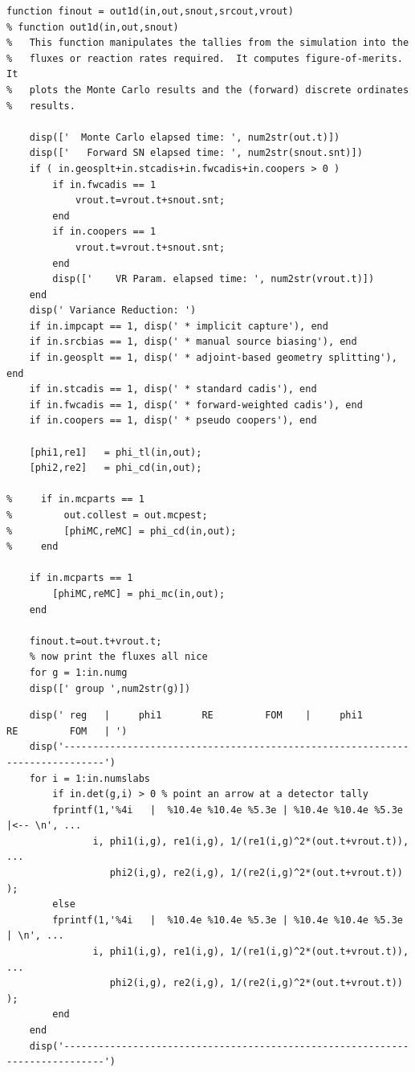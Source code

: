 \documentclass[letter,11pt]{article}
\begin{document}
{\small
\begin{verbatim}
function finout = out1d(in,out,snout,srcout,vrout)
% function out1d(in,out,snout)
%   This function manipulates the tallies from the simulation into the
%   fluxes or reaction rates required.  It computes figure-of-merits.  It
%   plots the Monte Carlo results and the (forward) discrete ordinates
%   results.

	disp(['  Monte Carlo elapsed time: ', num2str(out.t)])
    disp(['   Forward SN elapsed time: ', num2str(snout.snt)])
    if ( in.geosplt+in.stcadis+in.fwcadis+in.coopers > 0 )
        if in.fwcadis == 1
            vrout.t=vrout.t+snout.snt;
        end
        if in.coopers == 1
            vrout.t=vrout.t+snout.snt;
        end
        disp(['    VR Param. elapsed time: ', num2str(vrout.t)])
    end
    disp(' Variance Reduction: ')
    if in.impcapt == 1, disp(' * implicit capture'), end
    if in.srcbias == 1, disp(' * manual source biasing'), end
    if in.geosplt == 1, disp(' * adjoint-based geometry splitting'), end
    if in.stcadis == 1, disp(' * standard cadis'), end
    if in.fwcadis == 1, disp(' * forward-weighted cadis'), end
    if in.coopers == 1, disp(' * pseudo coopers'), end
    
    [phi1,re1]   = phi_tl(in,out);
    [phi2,re2]   = phi_cd(in,out);

%     if in.mcparts == 1
%         out.collest = out.mcpest;
%         [phiMC,reMC] = phi_cd(in,out);
%     end
    
    if in.mcparts == 1
    	[phiMC,reMC] = phi_mc(in,out);
    end
        
    finout.t=out.t+vrout.t;
    % now print the fluxes all nice
    for g = 1:in.numg
    disp([' group ',num2str(g)])
\end{verbatim}
}
{\footnotesize
\begin{verbatim}
    disp(' reg   |     phi1       RE         FOM    |     phi1       RE         FOM   | ')
    disp('-----------------------------------------------------------------------------')
    for i = 1:in.numslabs
        if in.det(g,i) > 0 % point an arrow at a detector tally
        fprintf(1,'%4i   |  %10.4e %10.4e %5.3e | %10.4e %10.4e %5.3e |<-- \n', ...
               i, phi1(i,g), re1(i,g), 1/(re1(i,g)^2*(out.t+vrout.t)), ...
                  phi2(i,g), re2(i,g), 1/(re2(i,g)^2*(out.t+vrout.t))  ); 
        else
        fprintf(1,'%4i   |  %10.4e %10.4e %5.3e | %10.4e %10.4e %5.3e | \n', ...
               i, phi1(i,g), re1(i,g), 1/(re1(i,g)^2*(out.t+vrout.t)), ...
                  phi2(i,g), re2(i,g), 1/(re2(i,g)^2*(out.t+vrout.t))  );
        end
    end
    disp('-----------------------------------------------------------------------------') 
\end{verbatim}
}
\end{document}
